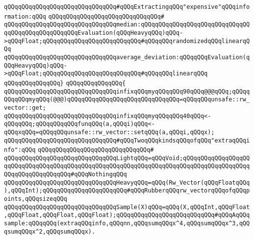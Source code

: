 \newline
\newline
\verb|qQQqqQQqqQQqqQQqqQQqqQQqqQQqqQQq#qQQqExtractingqQQq"expensive"qQQqinformation:qQQq|\newline
\verb|qQQqqQQqqQQqqQQqqQQqqQQqqQQqqQQq#|\newline
\verb|qQQqqQQqqQQqqQQqqQQqqQQqqQQqqQQqmedian:qQQqqQQqqQQqqQQqqQQqqQQqqQQqqQQqqQQqqQQqqQQqqQQqqQQqEvaluation(qQQqHeavyqQQq)qQQq->qQQqFloat;qQQqqQQqqQQqqQQqqQQqqQQqqQQq#qQQqqQQqrandomizedqQQqlinearqQQq|\newline
\verb|qQQqqQQqqQQqqQQqqQQqqQQqqQQqqQQqaverage_deviation:qQQqqQQqEvaluation(qQQqHeavyqQQq)qQQq->qQQqFloat;qQQqqQQqqQQqqQQqqQQqqQQqqQQq#qQQqqQQqlinearqQQq|\newline
\newline
\verb|qQQqqQQqqQQqqQQq}|\newline
\verb|qQQqqQQqqQQqqQQq{|\newline
\verb|qQQqqQQqqQQqqQQqqQQqqQQqqQQqqQQqinfixqQQqmyqQQqqQQq90qQQq@@@qQQq;qQQqqQQqqQQqmyqQQq(@@@)qQQqqQQqqQQqqQQqqQQqqQQqqQQqqQQq=qQQqqQQqunsafe::rw_vector::get;|\newline
\verb|qQQqqQQqqQQqqQQqqQQqqQQqqQQqqQQqinfixqQQqmyqQQqqQQq40qQQq<-qQQqqQQq;qQQqqQQqqQQqfunqQQq(a,qQQqi)qQQq<-qQQqxqQQq=qQQqqQQqunsafe::rw_vector::setqQQq(a,qQQqi,qQQqx);|\newline
\newline
\newline
\newline
\verb|qQQqqQQqqQQqqQQqqQQqqQQqqQQqqQQq#qQQqTwoqQQqkindsqQQqofqQQq"extraqQQqinfo":qQQq|\newline
\verb|qQQqqQQqqQQqqQQqqQQqqQQqqQQqqQQq#|\newline
\verb|qQQqqQQqqQQqqQQqqQQqqQQqqQQqqQQqLightqQQq=qQQqVoid;qQQqqQQqqQQqqQQqqQQqqQQqqQQqqQQqqQQqqQQqqQQqqQQqqQQqqQQqqQQqqQQqqQQqqQQqqQQqqQQqqQQqqQQqqQQqqQQqqQQqqQQqqQQq#qQQqNothingqQQq|\newline
\verb|qQQqqQQqqQQqqQQqqQQqqQQqqQQqqQQqHeavyqQQq=qQQq(Rw_Vector(qQQqFloatqQQq),qQQqInt);qQQqqQQqqQQqqQQqqQQqqQQq#qQQqRubberqQQqrw_vectorqQQqofqQQqpoints,qQQqsizeqQQq|\newline
\newline
\newline
\newline
\verb|qQQqqQQqqQQqqQQqqQQqqQQqqQQqqQQqSample(X)qQQq=qQQq(X,qQQqInt,qQQqFloat,qQQqFloat,qQQqFloat,qQQqFloat);qQQqqQQqqQQqqQQqqQQqqQQqqQQq#qQQqAqQQqsample:qQQqqQQq(extraqQQqinfo,qQQqnn,qQQqsumqQQqx^4,qQQqsumqQQqx^3,qQQqsumqQQqx^2,qQQqsumqQQqx).|\newline
